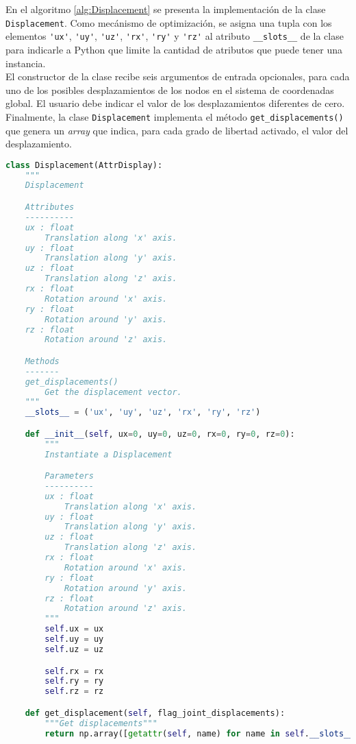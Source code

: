 En el algoritmo \ref{alg:Displacement} se presenta la implementación de la clase \verb|Displacement|. Como mecánismo de optimización, se asigna una tupla con los elementos \verb|'ux'|, \verb|'uy'|, \verb|'uz'|, \verb|'rx'|, \verb|'ry'| y \verb|'rz'| al atributo \verb|__slots__| de la clase para indicarle a Python que limite la cantidad de atributos que puede tener una instancia.\\

El constructor de la clase recibe seis argumentos de entrada opcionales, para cada uno de los posibles desplazamientos de los nodos en el sistema de coordenadas global. El usuario debe indicar el valor de los desplazamientos diferentes de cero.\\

Finalmente, la clase \verb|Displacement| implementa el método \verb|get_displacements()| que genera un \emph{array} que indica, para cada grado de libertad activado, el valor del desplazamiento.\\

\begin{lstlisting}[language=Python,caption=Clase \texttt{Displacement} implementada en el archivo \texttt{primitives.py}.,label=alg:Displacement, frame=single]
class Displacement(AttrDisplay):
    """
    Displacement

    Attributes
    ----------
    ux : float
        Translation along 'x' axis.
    uy : float
        Translation along 'y' axis.
    uz : float
        Translation along 'z' axis.
    rx : float
        Rotation around 'x' axis.
    ry : float
        Rotation around 'y' axis.
    rz : float
        Rotation around 'z' axis.

    Methods
    -------
    get_displacements()
        Get the displacement vector.
    """
    __slots__ = ('ux', 'uy', 'uz', 'rx', 'ry', 'rz')

    def __init__(self, ux=0, uy=0, uz=0, rx=0, ry=0, rz=0):
        """
        Instantiate a Displacement

        Parameters
        ----------
        ux : float
            Translation along 'x' axis.
        uy : float
            Translation along 'y' axis.
        uz : float
            Translation along 'z' axis.
        rx : float
            Rotation around 'x' axis.
        ry : float
            Rotation around 'y' axis.
        rz : float
            Rotation around 'z' axis.
        """
        self.ux = ux
        self.uy = uy
        self.uz = uz

        self.rx = rx
        self.ry = ry
        self.rz = rz

    def get_displacement(self, flag_joint_displacements):
        """Get displacements"""
        return np.array([getattr(self, name) for name in self.__slots__])[flag_joint_displacements]
\end{lstlisting}

